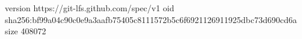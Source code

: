 version https://git-lfs.github.com/spec/v1
oid sha256:bf99a04c90c0e9a3aafb75405c8111572b5c6f6921126911925dbc73d690cd6a
size 408072
